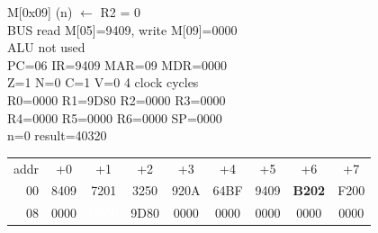 \begin{tcolorbox}[stepbox, title={Step 41 \hfill PC 05 \quad ST R2, n}]
M[0x09] (n) $\leftarrow$ R2 = 0\\
\textcolor{dim}{BUS} read M[05]=9409, \textcolor{wrt}{write M[09]=0000}\\
\textcolor{dim}{ALU} \textcolor{dim}{not used}\\
PC=06 IR=9409 MAR=09 MDR=0000\\
Z=1 N=0 C=1 V=0 \hfill \textcolor{dim}{4 clock cycles}\\
R0=0000 R1=9D80 R2=0000 R3=0000\\
R4=0000 R5=0000 R6=0000 SP=0000\\
\textcolor{dim}{n=0  result=40320}\\[1pt]
{\setlength{\tabcolsep}{1.6pt}\begin{tabular}{@{}r*{8}{c}@{}}
\textcolor{dim}{addr} & \textcolor{dim}{+0} & \textcolor{dim}{+1} & \textcolor{dim}{+2} & \textcolor{dim}{+3} & \textcolor{dim}{+4} & \textcolor{dim}{+5} & \textcolor{dim}{+6} & \textcolor{dim}{+7}\\
\textcolor{dim}{00} & 8409 & 7201 & 3250 & 920A & 64BF & 9409 & \cellcolor{pcc}\textbf{B202} & F200\\
\textcolor{dim}{08} & 0000 & \cellcolor{wrt}\textcolor{white}{\textbf{0000}} & \cellcolor{datac}9D80 & 0000 & 0000 & 0000 & 0000 & 0000\\
\end{tabular}}
\end{tcolorbox}\par\vspace{3pt}
